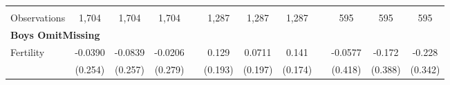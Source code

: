 \begin{landscape}
\begin{table}[htpb!]
\begin{center}
\begin{tabular}{lcccp{2mm}cccp{2mm}ccc}
\begin{footnotesize}\end{footnotesize}&\begin{footnotesize}\end{footnotesize}&\begin{footnotesize}\end{footnotesize}&\begin{footnotesize}\end{footnotesize}&\begin{footnotesize}\end{footnotesize}&\begin{footnotesize}\end{footnotesize}&\begin{footnotesize}\end{footnotesize}&\begin{footnotesize}\end{footnotesize}&\begin{footnotesize}\end{footnotesize}&\begin{footnotesize}\end{footnotesize}&\begin{footnotesize}\end{footnotesize}&\begin{footnotesize}\end{footnotesize}\\Observations&1,704&1,704&1,704&&1,287&1,287&1,287&&595&595&595\\
\multicolumn{12}{l}{\textbf{Boys OmitMissing}}\\ 
Fertility&-0.0390&-0.0839&-0.0206&&0.129&0.0711&0.141&&-0.0577&-0.172&-0.228\\
&(0.254)&(0.257)&(0.279)&&(0.193)&(0.197)&(0.174)&&(0.418)&(0.388)&(0.342)\\

\end{tabular}
\end{center}
\end{table}
\end{landscape}
